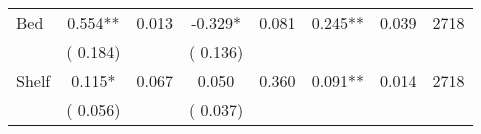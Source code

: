\begin{tabular}{l*{7}{c}}
 Bed       &              0.554**       &        0.013  &             -0.329*       &        0.081  &              0.245**       &              0.039 &  2718 \\ 
                       &       (       0.184)             &                               &       (       0.136)                     &                               &                                               &                                &                      \\ 

 Shelf       &              0.115*       &        0.067  &              0.050       &        0.360  &              0.091**       &              0.014 &  2718 \\ 
                       &       (       0.056)             &                               &       (       0.037)                     &                               &                                               &                                &                      \\ 

\hline \end{tabular}